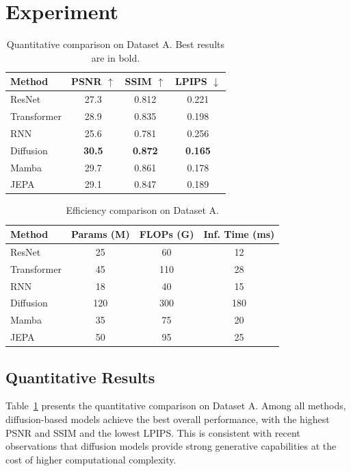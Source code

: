 \section{Experiment}

\begin{table}[t]
\centering
\caption{Quantitative comparison on Dataset A. Best results are in bold.}
\label{tab:main_results}
\setlength{\tabcolsep}{4pt}
\begin{tabular}{lccc}
\toprule
Method & PSNR $\uparrow$ & SSIM $\uparrow$ & LPIPS $\downarrow$ \\
\midrule
ResNet        & 27.3 & 0.812 & 0.221 \\
Transformer   & 28.9 & 0.835 & 0.198 \\
RNN           & 25.6 & 0.781 & 0.256 \\
Diffusion     & \textbf{30.5} & \textbf{0.872} & \textbf{0.165} \\
Mamba         & 29.7 & 0.861 & 0.178 \\
JEPA          & 29.1 & 0.847 & 0.189 \\
\bottomrule
\end{tabular}
\end{table}


\begin{table}[t]
\centering
\caption{Efficiency comparison on Dataset A.}
\label{tab:efficiency}
\setlength{\tabcolsep}{4pt}
\begin{tabular}{lccc}
\toprule
Method & Params (M) & FLOPs (G) & Inf. Time (ms) \\
\midrule
ResNet        & 25  & 60  & 12 \\
Transformer   & 45  & 110 & 28 \\
RNN           & 18  & 40  & 15 \\
Diffusion     & 120 & 300 & 180 \\
Mamba         & 35  & 75  & 20 \\
JEPA          & 50  & 95  & 25 \\
\bottomrule
\end{tabular}
\end{table}


\subsection{Quantitative Results}

Table~\ref{tab:main_results} presents the quantitative comparison on Dataset A. 
Among all methods, diffusion-based models achieve the best overall performance, 
with the highest PSNR and SSIM and the lowest LPIPS. This is consistent with 
recent observations that diffusion models provide strong generative capabilities 
at the cost of higher computational complexity.

